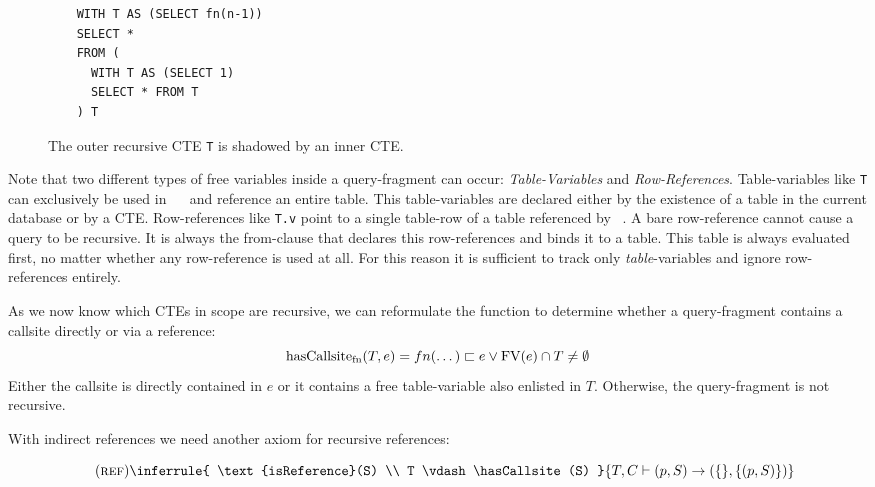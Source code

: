 \begin{wrapfigure}{r}{0.4\textwidth}
    \begin{verbatim}
    WITH T AS (SELECT fn(n-1))
    SELECT *
    FROM (
      WITH T AS (SELECT 1)
      SELECT * FROM T
    ) T
    \end{verbatim}
    \caption{The outer recursive CTE \texttt{T} is shadowed by an inner CTE.}
    \label{lst:indirect_callsite_ref}
\end{wrapfigure}

Note that two different types of free variables inside a query-fragment can occur: \textit{Table-Variables} and \textit{Row-References}. Table-variables like \texttt{T} can exclusively be used in ~\FROM~ and reference an entire table. This table-variables are declared either by the existence of a table in the current database or by a CTE. Row-references like \texttt{T.v} point to a single table-row of a table referenced by ~\FROM. A bare row-reference cannot cause a query to be recursive. It is always the from-clause that declares this row-references and binds it to a table. This table is always evaluated first, no matter whether any row-reference is used at all. For this reason it is sufficient to track only \textit{table}-variables and ignore row-references entirely.

As we now know which CTEs in scope are recursive, we can reformulate the function to determine whether a query-fragment contains a callsite directly or via a reference:
$$\operatorname{\text{hasCallsite}_{fn}}(T, e) = fn(\dots) \sqsubset e \lor \operatorname{\text{\rm FV}}(e) \cap T \neq \emptyset$$
Either the callsite is directly contained in $e$ or it contains a free table-variable also enlisted in $T$. Otherwise, the query-fragment is not recursive.

With indirect references we need another axiom for recursive references:

$$\quad(\textsc{ref})\inferrule{
   \text{isReference}(S) \\
   T \vdash \hasCallsite(S)
}{
    T, C \vdash (p, S) \rightarrow (\{\}, \{(p, S)\})
}$$


